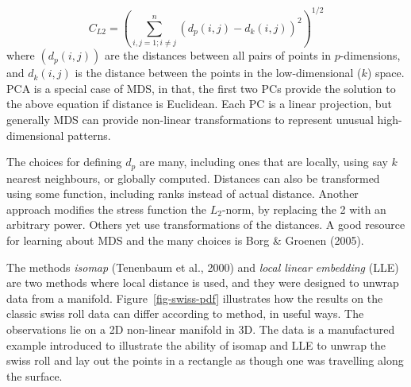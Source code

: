\documentclass[
  letterpaper,
]{krantz}
\begin{document}
\[
C_{L2} = \left(\sum_{i, j=1; i\neq j}^n (d_p(i,j) - d_k(i,j))^2\right)^{1/2}
\] where \((d_p(i,j))\) are the distances between all pairs of points in
\(p\)-dimensions, and \(d_k(i,j)\) is the distance between the points in
the low-dimensional (\(k\)) space. PCA is a special case of MDS, in
that, the first two PCs provide the solution to the above equation if
distance is Euclidean. Each PC is a linear projection, but generally MDS
can provide non-linear transformations to represent unusual
high-dimensional patterns.

The choices for defining \(d_p\) are many, including ones that are
locally, using say \(k\) nearest neighbours, or globally computed.
Distances can also be transformed using some function, including ranks
instead of actual distance. Another approach modifies the stress
function the \(L_2\)-norm, by replacing the 2 with an arbitrary power.
Others yet use transformations of the distances. A good resource for
learning about MDS and the many choices is Borg \& Groenen (2005).


The methods \emph{isomap} (Tenenbaum et al., 2000) and \emph{local
linear embedding} (LLE) are two methods where local distance is used,
and they were designed to unwrap data from a manifold.
Figure~\ref{fig-swiss-pdf} illustrates how the results on the classic
swiss roll data can differ according to method, in useful ways. The
observations lie on a 2D non-linear manifold in 3D. The data is a
manufactured example introduced to illustrate the ability of isomap and
LLE to unwrap the swiss roll and lay out the points in a rectangle as
though one was travelling along the surface.

 
\end{document}
